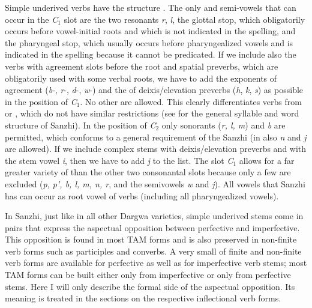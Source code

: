 Simple underived verbs have the structure . The only  and semi-vowels that can occur in the \textit{C$_{1}$} slot are the two resonants \textit{r}, \textit{l}, the glottal stop, which obligatorily occurs before vowel-initial roots and which is not indicated in the spelling, and the pharyngeal stop, which usually occurs before pharyngealized vowels and is indicated in the spelling because it cannot be predicated. If we include also the verbs with  agreement slots before the root and spatial preverbs, which are obligatorily used with some verbal roots, we have to add the exponents of  agreement (\textit{b}-, \textit{r}-, \textit{d}-, \textit{w}-) and the  of deixis/elevation preverbs (\textit{h}, \textit{k}, \textit{s}) as possible in the position of \textit{C$_{1}$}. No other  are allowed. This clearly differentiates verbs from  or , which do not have similar restrictions (see  for the general syllable and word structure of Sanzhi). In the position of \textit{C$_{2}$} only sonorants (\textit{r, l, m}) and \textit{b} are permitted, which conforms to a general requirement of the Sanzhi  (in  also \textit{n} and \textit{j} are allowed). If we include complex stems with deixis/elevation preverbs and with the stem vowel \textit{i}, then we have to add \textit{j} to the list. The slot \textit{C$_{1}$} allows for a far greater variety of  than the other two consonantal slots because only a few  are excluded (\textit{p, p', b, l, m, n, r}, and the semivowels \textit{w} and \textit{j}). All vowels that Sanzhi has can occur as root vowel of verbs (including all pharyngealized vowels).

In Sanzhi, just like in all other Dargwa varieties, simple underived stems come in pairs that express the aspectual opposition between perfective and imperfective. This opposition is found in most TAM forms and is also preserved in non-finite verb forms such as participles and converbs. A very small  of finite and non-finite verb forms are available for perfective as well as for imperfective verb stems; most TAM forms can be built either only from imperfective or only from perfective stems. Here I will only describe the formal side of the aspectual opposition. Its meaning is treated in the sections on the respective inflectional verb forms.

